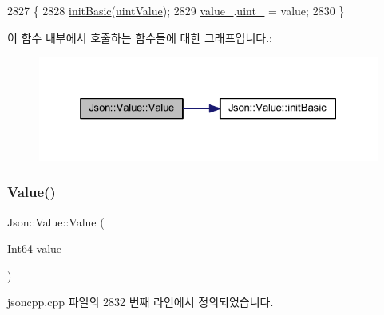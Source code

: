\begin{DoxyCode}
2827                        \{
2828   \hyperlink{class_json_1_1_value_a32b86b71564157f40f880f5736be822a}{initBasic}(\hyperlink{namespace_json_a7d654b75c16a57007925868e38212b4eaea788d9a3bb00adc6d68d97d43e1ccd3}{uintValue});
2829   \hyperlink{class_json_1_1_value_aef578244546212705b9f81eb84d7e151}{value\_}.\hyperlink{union_json_1_1_value_1_1_value_holder_aab65665dc15a24a29a8e93cdeeaa7e50}{uint\_} = value;
2830 \}
\end{DoxyCode}
이 함수 내부에서 호출하는 함수들에 대한 그래프입니다.\+:\nopagebreak
\begin{figure}[H]
\begin{center}
\leavevmode
\includegraphics[width=325pt]{class_json_1_1_value_ae67a857b01286e3499a87e95be848d20_cgraph}
\end{center}
\end{figure}
\mbox{\label{class_json_1_1_value_ab1cdc3d9a4d4cc03fa01439d43ceb1b5}} 
\subsubsection{\texorpdfstring{Value()}{Value()}\hspace{0.1cm}{\footnotesize\ttfamily [4/12]}}
{\footnotesize\ttfamily Json\+::\+Value\+::\+Value (\begin{DoxyParamCaption}\item[{\hyperlink{class_json_1_1_value_a1b86af9f85f0f1baa972c3319fa22695}{Int64}}]{value }\end{DoxyParamCaption})}



jsoncpp.\+cpp 파일의 2832 번째 라인에서 정의되었습니다.


